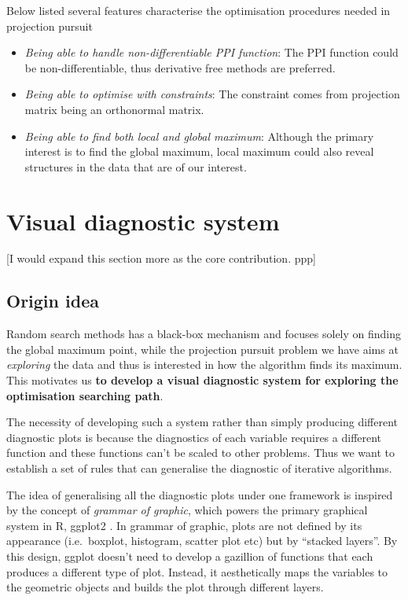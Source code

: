 \documentclass[12pt]{article}
\begin{document}
Below listed several features characterise the optimisation procedures
needed in projection pursuit

\begin{itemize}
\item
  \emph{Being able to handle non-differentiable PPI function}: The PPI
  function could be non-differentiable, thus derivative free methods are
  preferred.
\item
  \emph{Being able to optimise with constraints}: The constraint comes
  from projection matrix being an orthonormal matrix.
\item
  \emph{Being able to find both local and global maximum}: Although the
  primary interest is to find the global maximum, local maximum could
  also reveal structures in the data that are of our interest.
\end{itemize}

\hypertarget{vis-diag}{%
\section{Visual diagnostic system}\label{vis-diag}}

{[}I would expand this section more as the core contribution. ppp{]}

\hypertarget{origin-idea}{%
\subsection{Origin idea}\label{origin-idea}}

Random search methods has a black-box mechanism and focuses solely on
finding the global maximum point, while the projection pursuit problem
we have aims at \emph{exploring} the data and thus is interested in how
the algorithm finds its maximum. This motivates us \textbf{to develop a
visual diagnostic system for exploring the optimisation searching path}.

The necessity of developing such a system rather than simply producing
different diagnostic plots is because the diagnostics of each variable
requires a different function and these functions can't be scaled to
other problems. Thus we want to establish a set of rules that can
generalise the diagnostic of iterative algorithms.

The idea of generalising all the diagnostic plots under one framework is
inspired by the concept of \emph{grammar of
graphic}\citep{wickham2010layered}, which powers the primary graphical
system in R, ggplot2 \citep{ggplot2}. In grammar of graphic, plots are
not defined by its appearance (i.e.~boxplot, histogram, scatter plot
etc) but by ``stacked layers''. By this design, ggplot doesn't need to
develop a gazillion of functions that each produces a different type of
plot. Instead, it aesthetically maps the variables to the geometric
objects and builds the plot through different layers.
\end{document}
